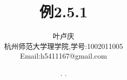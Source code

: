 \documentclass[a4paper, 12pt]{article} %
\makeatletter
\renewcommand{\maketitle}{ %
  \renewcommand\refname{参考文献}
  \newcommand{\D}{\displaystyle}\newcommand{\ri}{\Rightarrow}
  \newcommand{\ds}{\displaystyle} \renewcommand{\ni}{\noindent}
  \newcommand{\pa}{\partial} \newcommand{\Om}{\Omega}
  \newcommand{\om}{\omega} \newcommand{\sik}{\sum_{i=1}^k}
  \newcommand{\vov}{\Vert\omega\Vert} \newcommand{\Umy}{U_{\mu_i,y^i}}
  \newcommand{\lamns}{\lambda_n^{^{\scriptstyle\sigma}}}
  \newcommand{\chiomn}{\chi_{_{\Omega_n}}}
  \newcommand{\ullim}{\underline{\lim}} \newcommand{\bsy}{\boldsymbol}
  \newcommand{\mvb}{\mathversion{bold}} \newcommand{\la}{\lambda}
  \newcommand{\La}{\Lambda} \newcommand{\va}{\varepsilon}
  \newcommand{\be}{\beta} \newcommand{\al}{\alpha}
  \newcommand{\dis}{\displaystyle} \newcommand{\R}{{\mathbb R}}
  \newcommand{\N}{{\mathbb N}} \newcommand{\cF}{{\mathcal F}}
  \newcommand{\gB}{{\mathfrak B}} \newcommand{\eps}{\epsilon}
  \begin{flushright} %
    {\LARGE\@title} %
    
    \vspace{50pt} %
    
    {\large\@author} %
    \\\@date %
    
    \vspace{40pt} %
  \end{flushright}
}
\makeatother
\begin{document}
\begin{CJK}{UTF8}{gkai}
  \title{\textbf{例2.5.1}} 
  \author{\small{叶卢庆}\\{\small{杭州师范大学理学院,学号:1002011005}}\\{\small{Email:h5411167@gmail.com}}} %
  \renewcommand{\today}{\number\year. \number\month. \number\day}
  \date{\today} %
  
  
  
  \maketitle %
  
  
  
  
  
  
  

\end{CJK}
\end{document}
